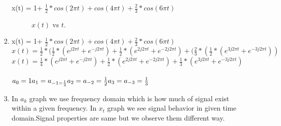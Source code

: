 \documentclass[10pt,a4paper, margin=1in]{article}
\begin{document}
\begin{enumerate}
\begin{enumerate}
    x(t) = 1+ $ \frac{1}{2}*cos(2 \pi t)  + cos(4 \pi t) +  \frac{2}{3}* cos(6 \pi t) $
    
    \begin{figure} [H]
        \centering


        \caption{$x(t)$ vs $t$.}
        \label{fig:3a}
    \end{figure}
    
    
    
    \item %

    
    x(t) = 1+ $ \frac{1}{2}*cos(2 \pi t)  + cos(4 \pi t) +  \frac{2}{3}* cos(6 \pi t) $
    \\
    $x(t) = \frac{1}{2}*(\frac{1}{2}*(e^{j 2 \pi t} + e^{-j 2 \pi t}) + \frac{1}{2}*(e^{2 j 2 \pi t} + e^{- 2 j 2 \pi t}) + (\frac{2}{3} *( \frac{1}{2}*(e^{3 j 2 \pi t} + e^{- 3 j 2 \pi t}))  $
    \\
    $x(t) = \frac{1}{4}*(e^{j 2 \pi t} + e^{-j 2 \pi t}) + \frac{1}{2}*(e^{2 j 2 \pi t} + e^{- 2 j 2 \pi t}) +  \frac{1}{3}*(e^{3 j 2 \pi t} + e^{- 3 j 2 \pi t})  $
    \\
    \\
    $a_0=1
    \\
    a_1=a_{-1 = \frac{1}{4}}
    \\
    a_2=a_{-2}=\frac{1}{2}
    \\a_3=a_{-3}=\frac{1}{3}$
    
    \item %
    
    In $a_k$ graph we use frequency domain which is how much of signal exist within a given frequency.
    In $x_t$ graph we see signal behavior in given time domain.Signal properties are same but we observe them different way.
    \\
    

\end{enumerate}
\end{enumerate}
\end{document}
